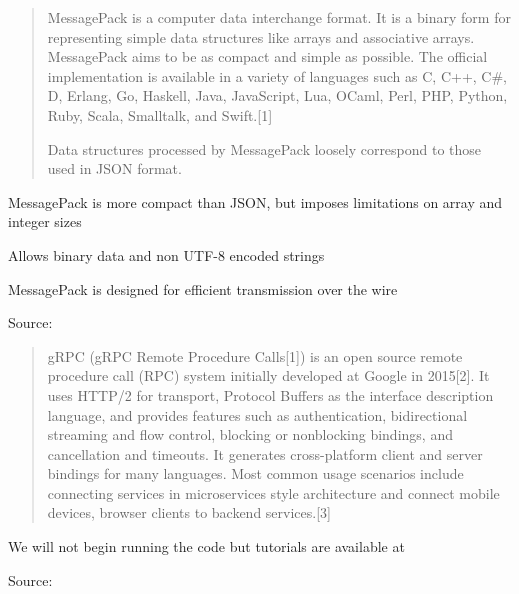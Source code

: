 \documentclass[Screen16to9,17pt]{foils}
\begin{document}

\begin{quote}
MessagePack is a computer data interchange format. It is a binary form for representing simple data structures like arrays and associative arrays. MessagePack aims to be as compact and simple as possible. The official implementation is available in a variety of languages such as C, C++, C\#, D, Erlang, Go, Haskell, Java, JavaScript, Lua, OCaml, Perl, PHP, Python, Ruby, Scala, Smalltalk, and Swift.[1]{\bf

Data structures processed by MessagePack loosely correspond to those used in JSON format.}
\end{quote}

\begin{list2}
\item MessagePack is more compact than JSON, but imposes limitations on array and integer sizes
\item Allows binary data and non UTF-8 encoded strings
\item MessagePack is designed for efficient transmission over the wire
\end{list2}
Source: {\footnotesize\\
}




\begin{quote}
gRPC (gRPC Remote Procedure Calls[1]) is an open source remote procedure call (RPC) system initially developed at Google in 2015[2]. It uses HTTP/2 for transport, Protocol Buffers as the interface description language, and provides features such as authentication, bidirectional streaming and flow control, blocking or nonblocking bindings, and cancellation and timeouts. It generates cross-platform client and server bindings for many languages. Most common usage scenarios include connecting services in microservices style architecture and connect mobile devices, browser clients to backend services.[3]
\end{quote}

\begin{list2}
\item We will not begin running the code but tutorials are available at  
\end{list2}
Source: {\footnotesize\\
 }

\end{document}
